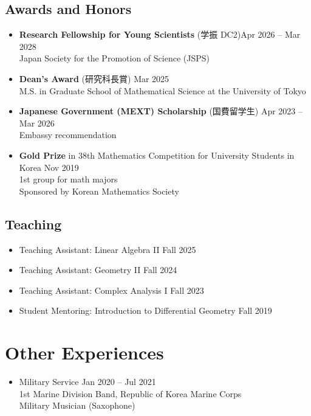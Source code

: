 \documentclass[11pt,a4paper]{article}
\begin{document}
\subsection*{Awards and Honors}
\begin{itemize}
\item
	\textbf{Research Fellowship for Young Scientists} (学振 DC2)\hfill{\small Apr 2026 -- Mar 2028}\\
	Japan Society for the Promotion of Science (JSPS)
\item
	\textbf{Dean's Award} (研究科長賞)
	\hfill{\small Mar 2025}\\
	M.S. in Graduate School of Mathematical Science at the University of Tokyo
\item
	\textbf{Japanese Government (MEXT) Scholarship} (国費留学生)
	\hfill{\small Apr 2023 -- Mar 2026}\\
	Embassy recommendation
\item
	\textbf{Gold Prize} in 38th Mathematics Competition for University Students in Korea
	\hfill{\small Nov 2019}\\
	1st group for math majors\\
	Sponsored by Korean Mathematics Society
\end{itemize}


\subsection*{Teaching}

\begin{itemize}
\item
	Teaching Assistant: Linear Algebra II
	\hfill{\small Fall 2025}
\item
	Teaching Assistant: Geometry II
	\hfill{\small Fall 2024}
\item
	Teaching Assistant: Complex Analysis I
	\hfill{\small Fall 2023}
\item
	Student Mentoring: Introduction to Differential Geometry
	\hfill{\small Fall 2019}\\
\end{itemize}


\section*{Other Experiences}
\begin{itemize}
\item
	Military Service
	\hfill{\small Jan 2020 -- Jul 2021}\\
	1st Marine Division Band, Republic of Korea Marine Corps\\
	Military Musician (Saxophone)
\end{itemize}
\end{document}
